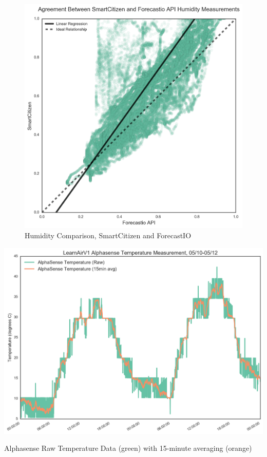 \begin{figure}[htb]
 	\includegraphics[width=\textwidth]{figs/humidity_sck_v_forecastio}               
 	 \caption{Humidity Comparison, SmartCitizen and ForecastIO}
  	\label{fig:humidity_sck_v_forecastio}
\end{figure}

\begin{marginfigure}[3.5cm]
 	\includegraphics[width=\textwidth]{figs/temp_alphasense}               
 	 \caption{Alphasense Raw Temperature Data (green) with 15-minute averaging (orange)}
  	\label{fig:temp_alphasense}
\end{marginfigure}


